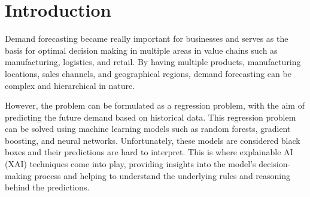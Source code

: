 \section{Introduction}\label{sec:introduction}


Demand forecasting became really important for businesses and serves as the basis for optimal decision making in multiple areas in value chains such as manufacturing, logistics, and retail.
By having multiple products, manufacturing locations, sales channels, and geographical regions, demand forecasting can be complex and hierarchical in nature.

However, the problem can be formulated as a regression problem, with the aim of predicting the future demand based on historical data.
This regression problem can be solved using machine learning models such as random forests, gradient boosting, and neural networks.
Unfortunately, these models are considered black boxes and their predictions are hard to interpret.
This is where explainable AI (XAI) techniques come into play, providing insights into the model's decision-making process and helping to understand the underlying rules and reasoning behind the predictions.

